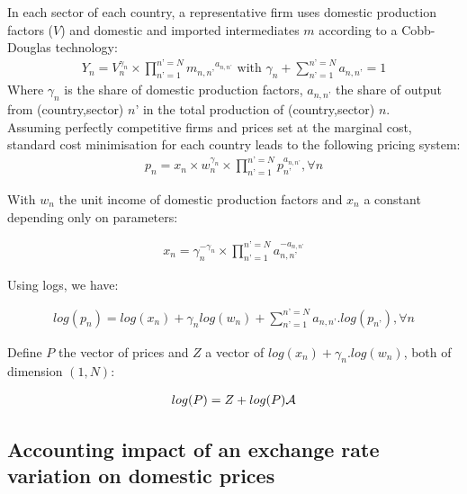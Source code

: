 \documentclass[11pt,a4paper]{paper} %
\begin{document}
In each sector of each country, a representative firm uses domestic production factors ($V$) and domestic and imported intermediates $m$ according to a Cobb-Douglas technology:
\begin{eqnarray*}
Y_n=V^{\gamma_n}_n \times \prod_{n’=1}^{n’=N} {m_{n,n’}}^{a_{n,n’}} \text{ with } \gamma_n +\sum_{n’=1}^{n’=N} {a_{n,n’}} =1
\end{eqnarray*}
Where $\gamma_n$ is the share of domestic production factors, $a_{n,n’}$ the share of output from (country,sector) $n’$ in the total production of (country,sector) $n$. \\ 
Assuming perfectly competitive firms and prices set at the marginal cost, standard cost minimisation for each country leads to the following pricing system:
\begin{eqnarray*}
	p_n=x_n \times w_n^{\gamma_n} \times \prod_{n’=1}^{n’=N}p_{n’}^{a_{n,n’}}, \forall n 
\end{eqnarray*}

With $w_n$ the unit income of domestic production factors and $x_n$ a constant depending only on parameters:

\begin{eqnarray*}
	x_n=\gamma_n^{-\gamma_n} \times \prod_{n’=1}^{n’=N}a_{n,n’}^{-a_{n,n’}}
\end{eqnarray*}

Using logs, we have:

\begin{eqnarray*}
	log(p_n) = log(x_n) + \gamma_n log(w_n) + \sum_{n’=1}^{n’=N}a_{n,n’}.log(p_{n’}), \forall n
\end{eqnarray*}

Define $P$ the vector of prices and $Z$ a vector of $log(x_n)+\gamma_n.log(w_n)$, both of dimension $(1,N)$: 

\begin{eqnarray}
	log(P)=Z + log(P){\cal A}
	\label{eq:priceequation} 
\end{eqnarray}




\subsection{Accounting impact of an exchange rate variation on domestic prices} \label{subsec:chocchange}
\end{document}
